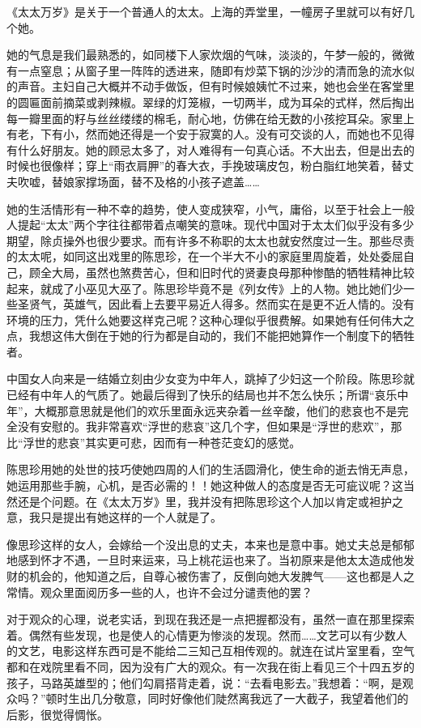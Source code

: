 \par 《太太万岁》是关于一个普通人的太太。上海的弄堂里，一幢房子里就可以有好几个她。
\par 她的气息是我们最熟悉的，如同楼下人家炊烟的气味，淡淡的，午梦一般的，微微有一点窒息；从窗子里一阵阵的透进来，随即有炒菜下锅的沙沙的清而急的流水似的声音。主妇自己大概并不动手做饭，但有时候娘姨忙不过来，她也会坐在客堂里的圆匾面前摘菜或剥辣椒。翠绿的灯笼椒，一切两半，成为耳朵的式样，然后掏出每一瓣里面的籽与丝丝缕缕的棉毛，耐心地，仿佛在给无数的小孩挖耳朵。家里上有老，下有小，然而她还得是一个安于寂寞的人。没有可交谈的人，而她也不见得有什么好朋友。她的顾忌太多了，对人难得有一句真心话。不大出去，但是出去的时候也很像样；穿上“雨衣肩胛”的春大衣，手挽玻璃皮包，粉白脂红地笑着，替丈夫吹嘘，替娘家撑场面，替不及格的小孩子遮盖……
\par 她的生活情形有一种不幸的趋势，使人变成狭窄，小气，庸俗，以至于社会上一般人提起“太太”两个字往往都带着点嘲笑的意味。现代中国对于太太们似乎没有多少期望，除贞操外也很少要求。而有许多不称职的太太也就安然度过一生。那些尽责的太太呢，如同这出戏里的陈思珍，在一个半大不小的家庭里周旋着，处处委屈自己，顾全大局，虽然也煞费苦心，但和旧时代的贤妻良母那种惨酷的牺牲精神比较起来，就成了小巫见大巫了。陈思珍毕竟不是《列女传》上的人物。她比她们少一些圣贤气，英雄气，因此看上去要平易近人得多。然而实在是更不近人情的。没有环境的压力，凭什么她要这样克己呢？这种心理似乎很费解。如果她有任何伟大之点，我想这伟大倒在于她的行为都是自动的，我们不能把她算作一个制度下的牺牲者。
\par 中国女人向来是一结婚立刻由少女变为中年人，跳掉了少妇这一个阶段。陈思珍就已经有中年人的气质了。她最后得到了快乐的结局也并不怎么快乐；所谓“哀乐中年”，大概那意思就是他们的欢乐里面永远夹杂着一丝辛酸，他们的悲哀也不是完全没有安慰的。我非常喜欢“浮世的悲哀”这几个字，但如果是“浮世的悲欢”，那比“浮世的悲哀”其实更可悲，因而有一种苍茫变幻的感觉。
\par 陈思珍用她的处世的技巧使她四周的人们的生活圆滑化，使生命的逝去悄无声息，她运用那些手腕，心机，是否必需的！！她这种做人的态度是否无可疵议呢？这当然还是个问题。在《太太万岁》里，我并没有把陈思珍这个人加以肯定或袒护之意，我只是提出有她这样的一个人就是了。
\par 像思珍这样的女人，会嫁给一个没出息的丈夫，本来也是意中事。她丈夫总是郁郁地感到怀才不遇，一旦时来运来，马上桃花运也来了。当初原来是他太太造成他发财的机会的，他知道之后，自尊心被伤害了，反倒向她大发脾气——这也都是人之常情。观众里面阅历多一些的人，也许不会过分谴责他的罢？
\par 对于观众的心理，说老实话，到现在我还是一点把握都没有，虽然一直在那里探索着。偶然有些发现，也是使人的心情更为惨淡的发现。然而……文艺可以有少数人的文艺，电影这样东西可是不能给二三知己互相传观的。就连在试片室里看，空气都和在戏院里看不同，因为没有广大的观众。有一次我在街上看见三个十四五岁的孩子，马路英雄型的；他们勾肩搭背走着，说：“去看电影去。”我想着：“啊，是观众吗？”顿时生出几分敬意，同时好像他们陡然离我远了一大截子，我望着他们的后影，很觉得惆怅。
